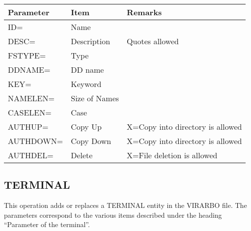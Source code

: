 \documentclass[letterpaper,10pt,english]{sphinxmanual}
\begin{document}
\begin{savenotes}\sphinxattablestart
\centering
\begin{tabulary}{\linewidth}[t]{|T|T|T|}
\hline
\sphinxstyletheadfamily 
Parameter
&\sphinxstyletheadfamily 
Item
&\sphinxstyletheadfamily 
Remarks
\\
\hline
ID=
&
Name
&\\
\hline
DESC=
&
Description
&
Quotes allowed
\\
\hline
FSTYPE=
&
Type
&\\
\hline
DDNAME=
&
DD name
&\\
\hline
KEY=
&
Keyword
&\\
\hline
NAMELEN=
&
Size of Names
&\\
\hline
CASELEN=
&
Case
&\\
\hline
AUTHUP=
&
Copy Up
&
X=Copy into directory is allowed
\\
\hline
AUTHDOWN=
&
Copy Down
&
X=Copy into directory is allowed
\\
\hline
AUTHDEL=
&
Delete
&
X=File deletion is allowed
\\
\hline
\end{tabulary}
\par
\sphinxattableend\end{savenotes}

\ignorespaces 

\subsection{TERMINAL}
\label{\detokenize{Installation_Guide:terminal}}\label{\detokenize{Installation_Guide:index-174}}
This operation adds or replaces a TERMINAL entity in the VIRARBO file. The parameters correspond to the various items described under the heading “Parameter of the terminal”.
\end{document}
